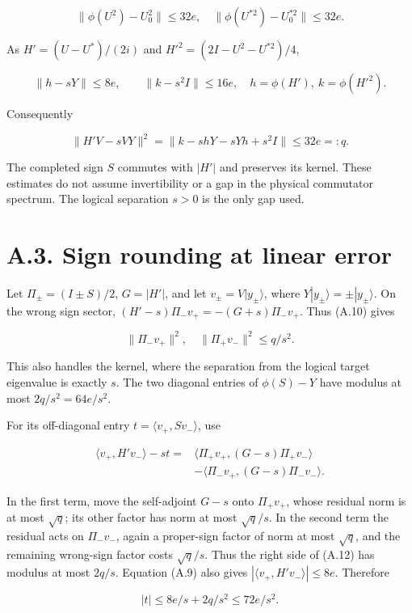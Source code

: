 \documentclass[11pt]{article}
\begin{document}
\[
\|\phi(U^2)-U_0^2\|\le32e,
\quad \|\phi(U^{*2})-U_0^{*2}\|\le32e.
\tag{A.8}
\]

As \(H'=(U-U^*)/(2i)\) and \(H'^2=(2I-U^2-U^{*2})/4\),

\[
\|h-sY\|\le8e,\qquad
\|k-s^2I\|\le16e,
\quad h=\phi(H'),\ k=\phi(H'^2).
\tag{A.9}
\]

Consequently

\[
\|H'V-sVY\|^2
=\|k-shY-sYh+s^2I\|\le32e=:q.
\tag{A.10}
\]

The completed sign \(S\) commutes with \(|H'|\) and preserves its kernel.
These estimates do not assume invertibility or a gap in the physical
commutator spectrum. The logical separation \(s>0\) is the only gap used.

\section*{A.3. Sign rounding at linear error}

Let \(\Pi_\pm=(I\pm S)/2\), \(G=|H'|\), and let
\(v_\pm=V|y_\pm\rangle\), where \(Y|y_\pm\rangle=\pm|y_\pm\rangle\).
On the wrong sign sector,
\((H'-s)\Pi_-v_+=-(G+s)\Pi_-v_+\). Thus (A.10) gives

\[
\|\Pi_-v_+\|^2,\quad\|\Pi_+v_-\|^2\le q/s^2.
\tag{A.11}
\]

This also handles the kernel, where the separation from the logical target
eigenvalue is exactly \(s\). The two diagonal entries of \(\phi(S)-Y\)
have modulus at most \(2q/s^2=64e/s^2\).

For its off-diagonal entry \(t=\langle v_+,Sv_-\rangle\), use

\[
\begin{aligned}
\langle v_+,H'v_-\rangle-st
={}&\langle\Pi_+v_+,(G-s)\Pi_+v_-\rangle\\
&-\langle\Pi_-v_+,(G-s)\Pi_-v_-\rangle.
\end{aligned}
\tag{A.12}
\]

In the first term, move the self-adjoint \(G-s\) onto \(\Pi_+v_+\),
whose residual norm is at most \(\sqrt q\); its other factor has norm
at most \(\sqrt q/s\). In the second term the residual acts on
\(\Pi_-v_-\), again a proper-sign factor of norm at most \(\sqrt q\),
and the remaining wrong-sign factor costs \(\sqrt q/s\). Thus the
right side of (A.12) has modulus at most \(2q/s\). Equation (A.9) also
gives \(|\langle v_+,H'v_-\rangle|\le8e\). Therefore

\[
|t|\le8e/s+2q/s^2\le72e/s^2.
\tag{A.13}
\]
\end{document}
